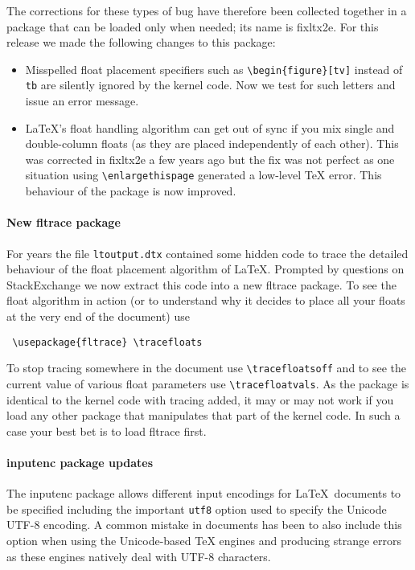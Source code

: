 \documentclass{ltnews}
\begin{document}
The corrections for these types of bug have therefore been collected together
in a package that can be loaded only when needed; its name is \textsf{fixltx2e}.
For this release we made the following changes to this package:
\begin{itemize}
\item
   Misspelled float placement specifiers such as
   \verb=\begin{figure}[tv]= instead of \texttt{tb} are silently
   ignored by the kernel code.  Now we test for such letters and issue
   an error message.
\item
   \LaTeX's float handling algorithm can get out of sync if you mix
   single and double-column floats (as they are placed independently
   of each other). This was corrected in \textsf{fixltx2e} a few years ago
   but the fix was not perfect as one situation using
   \verb=\enlargethispage= generated a low-level \TeX{} error. 
   This behaviour of the package is now improved.
\end{itemize}




\paragraph{New \textsf{fltrace} package}

For years the file \texttt{ltoutput.dtx} contained some hidden code to
trace the detailed behaviour of the float placement algorithm of
\LaTeX. Prompted by questions on StackExchange we now extract this
code into a new \textsf{fltrace} package. To see the float algorithm
in action (or to understand why it decides to place all your floats at
the very end of the document) use
\begin{verbatim}
 \usepackage{fltrace} \tracefloats
\end{verbatim}
To stop tracing somewhere in the document use
\verb=\tracefloatsoff= and to see the current value of various float
parameters use \verb=\tracefloatvals=. As the package is identical to
the kernel code with tracing added, it may or may not work if you load any
other package that manipulates that part of the kernel code. In such a
case your best bet is to load \textsf{fltrace} first.

\paragraph{\textsf{inputenc} package updates}

The \textsf{inputenc} package allows different input encodings for
\LaTeX\ documents to be specified including the important
\texttt{utf8} option used to specify the Unicode UTF-8 encoding. A
common mistake in documents has been to also include this option when
using the Unicode-based TeX engines  and 
producing strange errors as these engines natively deal with UTF-8
characters.
\end{document}
